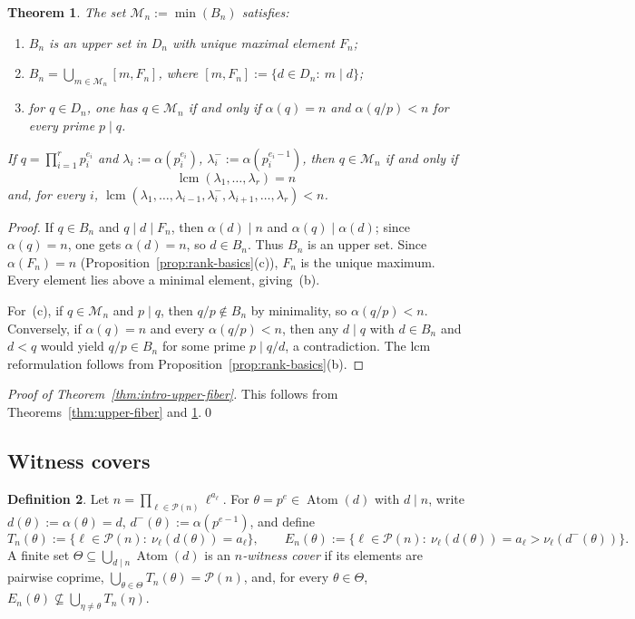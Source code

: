 \documentclass[11pt,letterpaper]{article}
\numberwithin{equation}{section}
\theoremstyle{plain}
\newtheorem{theorem}{Theorem}[section]
\theoremstyle{definition}
\newtheorem{definition}[theorem]{Definition}
\theoremstyle{remark}
\DeclareMathOperator{\lcmop}{lcm}
\DeclareMathOperator{\Atom}{Atom}
\begin{document}
\begin{theorem}\label{thm:minimal-generators}
The set $\mathcal M_n:=\min(B_n)$ satisfies:
\begin{enumerate}[label=\textup{(\alph*)}]
\item $B_n$ is an upper set in $D_n$ with unique maximal element $F_n$;
\item $B_n=\bigcup_{m\in\mathcal M_n}[m,F_n]$, where
$[m,F_n]:=\{d\in D_n:\ m\mid d\}$;
\item for $q\in D_n$, one has $q\in\mathcal M_n$ if and only if
$\alpha(q)=n$ and $\alpha(q/p)<n$ for every prime $p\mid q$.
\end{enumerate}
If $q=\prod_{i=1}^r p_i^{e_i}$ and $\lambda_i:=\alpha(p_i^{e_i})$,
$\lambda_i^-:=\alpha(p_i^{e_i-1})$, then $q\in\mathcal M_n$ if and only if
\begin{equation}\label{eq:lcm-criterion}
\lcmop(\lambda_1,\dots,\lambda_r)=n
\end{equation}
and, for every $i$,
$\lcmop(\lambda_1,\dots,\lambda_{i-1},\lambda_i^-,\lambda_{i+1},\dots,
\lambda_r)<n$.
\end{theorem}

\begin{proof}
If $q\in B_n$ and $q\mid d\mid F_n$, then $\alpha(d)\mid n$ and
$\alpha(q)\mid\alpha(d)$; since $\alpha(q)=n$, one gets $\alpha(d)=n$, so
$d\in B_n$. Thus $B_n$ is an upper set. Since $\alpha(F_n)=n$
(Proposition~\ref{prop:rank-basics}(c)), $F_n$ is the unique maximum.
Every element lies above a minimal element, giving~(b).

For~(c), if $q\in\mathcal M_n$ and $p\mid q$, then $q/p\notin B_n$ by
minimality, so $\alpha(q/p)<n$. Conversely, if $\alpha(q)=n$ and every
$\alpha(q/p)<n$, then any $d\mid q$ with $d\in B_n$ and $d<q$ would yield
$q/p\in B_n$ for some prime $p\mid q/d$, a contradiction. The lcm
reformulation follows from
Proposition~\ref{prop:rank-basics}(b).
\end{proof}

\noindent\emph{Proof of Theorem~\ref{thm:intro-upper-fiber}.}
This follows from Theorems~\ref{thm:upper-fiber} and
\ref{thm:minimal-generators}.\qed

\subsection*{Witness covers}

\begin{definition}\label{def:witness-cover}
Let $n=\prod_{\ell\in\mathcal P(n)}\ell^{a_\ell}$. For
$\theta=p^e\in\Atom(d)$ with $d\mid n$, write $d(\theta):=\alpha(\theta)=d$,
$d^-(\theta):=\alpha(p^{e-1})$, and define
\[
T_n(\theta):=\{\ell\in\mathcal P(n):\ \nu_\ell(d(\theta))=a_\ell\},
\qquad
E_n(\theta):=\{\ell\in\mathcal P(n):\ \nu_\ell(d(\theta))=a_\ell>
\nu_\ell(d^-(\theta))\}.
\]
A finite set $\Theta\subseteq\bigcup_{d\mid n}\Atom(d)$ is an
\emph{$n$-witness cover} if its elements are pairwise coprime,
$\bigcup_{\theta\in\Theta}T_n(\theta)=\mathcal P(n)$, and, for every
$\theta\in\Theta$,
$E_n(\theta)\nsubseteq\bigcup_{\eta\neq\theta}T_n(\eta)$.
\end{definition}
\end{document}

